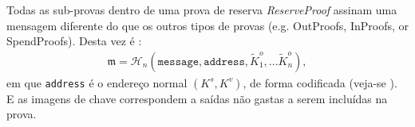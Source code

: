 Todas as sub-provas dentro de uma prova de reserva {\em ReserveProof} assinam uma mensagem diferente do que os outros tipos de provas (e.g. OutProofs, InProofs, or SpendProofs). Desta vez é :
\begin{align*}
\mathfrak{m} = \mathcal{H}_n(\texttt{message}, \texttt{address}, \tilde{K}^o_1, ... \tilde{K}^o_n) ,
\end{align*}
em que {\tt address} é o endereço normal $(K^s, K^v)$, de forma codificada (veja-se \cite{luigi-address}). E as imagens de chave correspondem a saídas não gastas a serem incluídas na prova. 


